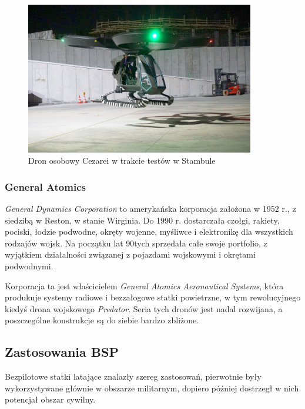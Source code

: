 \begin{figure}[!h]
  \centering
  \includegraphics[width=10cm]{./Obrazy/cezarei.jpg}
  \caption{Dron osobowy Cezarei w trakcie testów w Stambule}
  \end{figure}

\subsubsection{General Atomics}
\hspace{1cm}\textit{General Dynamics Corporation} to amerykańska korporacja założona w 1952 r., z siedzibą w Reston, w stanie Wirginia. Do 1990 r. dostarczała czołgi, rakiety, pociski, łodzie podwodne, okręty wojenne, myśliwce i elektronikę dla wszystkich rodzajów wojsk. Na początku lat 90tych sprzedała całe swoje portfolio, z wyjątkiem działalności związanej z pojazdami wojskowymi i okrętami podwodnymi.

Korporacja ta jest właścicielem \textit{General Atomics Aeronautical Systems}, która produkuje systemy radiowe i bezzałogowe statki powietrzne, w tym rewolucyjnego kiedyś drona wojskowego \textit{Predator}. Seria tych dronów jest nadal rozwijana, a poszczególne konstrukcje są do siebie bardzo zbliżone.\cite{gd-about}\cite{wiki-gaas}

\subsection{Zastosowania BSP}
\hspace{1cm}Bezpilotowe statki latające znalazły szereg zastosowań, pierwotnie były wykorzystywane głównie w obszarze militarnym, dopiero później dostrzegł w nich potencjał obszar cywilny.

